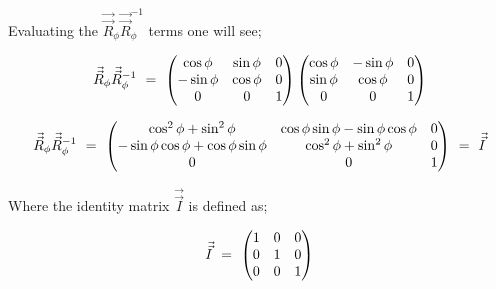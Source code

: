 \documentclass[11pt]{article}
\begin{document}
Evaluating the \begin{math} \vec{\vec{R}}_{\phi} \vec{\vec{R}}_{\phi}^{-1} \end{math} terms one will see;

\begin{equation}
\vec{\vec{R}}_{\phi} \vec{\vec{R}}_{\phi}^{-1} \hspace{0.125cm} = \hspace{0.125cm} 
\begin{pmatrix}
\cos{\phi} & \sin{\phi} & 0 \\
-\sin{\phi} & \cos{\phi} & 0 \\
0 & 0 & 1 
\end{pmatrix}
\begin{pmatrix}
\cos{\phi} & -\sin{\phi} & 0 \\
\sin{\phi} & \cos{\phi} & 0 \\
0 & 0 & 1 
\end{pmatrix}
\end{equation}

\begin{equation}
\vec{\vec{R}}_{\phi} \vec{\vec{R}}_{\phi}^{-1} 
\hspace{0.125cm} = \hspace{0.125cm} 
\begin{pmatrix}
\cos^{2}{\phi} + \sin^{2}{\phi} & \cos{\phi} \sin{\phi} - \sin{\phi} \cos{\phi} & 0 \\
- \sin{\phi} \cos{\phi} + \cos{\phi} \sin{\phi} & \cos^{2}{\phi} + \sin^{2}{\phi} & 0 \\
0 & 0 & 1 
\end{pmatrix}
\hspace{0.125cm} = \hspace{0.125cm} \vec{\vec{I}}
\end{equation}

Where the identity matrix \begin{math} \vec{\vec{I}} \end{math} is defined as;

\begin{equation}
 \vec{\vec{I}}
\hspace{0.125cm} = \hspace{0.125cm} 
\begin{pmatrix}
1 & 0 & 0 \\
0 & 1 & 0 \\
0 & 0 & 1 
\end{pmatrix}
\end{equation}
\end{document}
